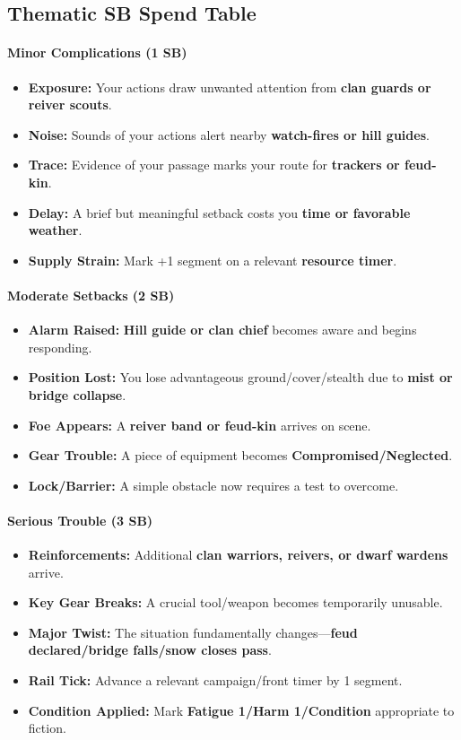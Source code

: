 \subsection*{Thematic SB Spend Table}
\label{sec:ubral-sb}

\paragraph{Minor Complications (1 SB)}
\begin{itemize}
\item \textbf{Exposure:} Your actions draw unwanted attention from \textbf{clan guards or reiver scouts}.
\item \textbf{Noise:} Sounds of your actions alert nearby \textbf{watch-fires or hill guides}.
\item \textbf{Trace:} Evidence of your passage marks your route for \textbf{trackers or feud-kin}.
\item \textbf{Delay:} A brief but meaningful setback costs you \textbf{time or favorable weather}.
\item \textbf{Supply Strain:} Mark +1 segment on a relevant \textbf{resource timer}.
\end{itemize}

\paragraph{Moderate Setbacks (2 SB)}
\begin{itemize}
\item \textbf{Alarm Raised:} \textbf{Hill guide or clan chief} becomes aware and begins responding.
\item \textbf{Position Lost:} You lose advantageous ground/cover/stealth due to \textbf{mist or bridge collapse}.
\item \textbf{Foe Appears:} A \textbf{reiver band or feud-kin} arrives on scene.
\item \textbf{Gear Trouble:} A piece of equipment becomes \textbf{Compromised/Neglected}.
\item \textbf{Lock/Barrier:} A simple obstacle now requires a test to overcome.
\end{itemize}

\paragraph{Serious Trouble (3 SB)}
\begin{itemize}
\item \textbf{Reinforcements:} Additional \textbf{clan warriors, reivers, or dwarf wardens} arrive.
\item \textbf{Key Gear Breaks:} A crucial tool/weapon becomes temporarily unusable.
\item \textbf{Major Twist:} The situation fundamentally changes---\textbf{feud declared/bridge falls/snow closes pass}.
\item \textbf{Rail Tick:} Advance a relevant campaign/front timer by 1 segment.
\item \textbf{Condition Applied:} Mark \textbf{Fatigue 1/Harm 1/Condition} appropriate to fiction.
\end{itemize}

